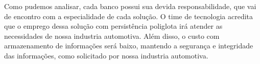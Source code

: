Como pudemos analisar, cada banco possui sua devida responsabilidade, que vai de encontro com a especialidade de cada solução. O time de tecnologia acredita que o emprego dessa solução com persistência poliglota irá atender as necessidades de nossa industria automotiva. Além disso, o custo com armazenamento de informações será baixo, mantendo a segurança e integridade das informações, como solicitado por nossa industria automotiva.